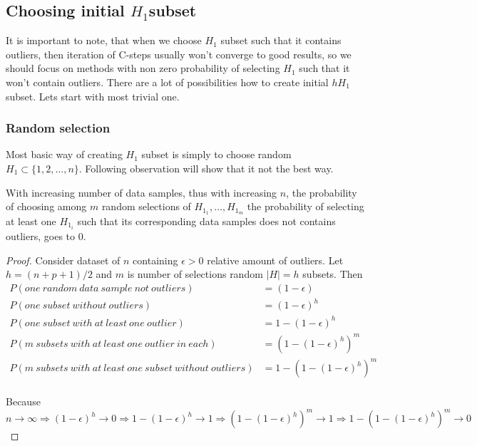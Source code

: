 \subsection{Choosing initial $H_1$subset}

It is important to note, that when we choose $H_1$ subset such that it contains outliers, then iteration of  C-steps
usually won't converge to good results, so we should focus on methods with non zero probability of selecting $H_1$ such that it won't contain outliers.
There are a lot of possibilities how to create initial $hH_1$ subset. Lets start with most trivial one.


\subsubsection{Random selection}
Most basic way of creating $H_1$ subset is simply to choose random $H_1 \subset \{{1,2,\ldots , n\}}$. Following observation will show that it not the best way.

\begin{observation}
	With increasing number of data samples, thus with increasing $n$, the probability of choosing among $m$ random selections of $H_{1_1}, \ldots ,H_{1_m}$ the probability of selecting
	at least one $H_{1_i}$ such that its corresponding data samples does not contains outliers, goes to $0$.
\end{observation}

\begin{proof}
	Consider dataset of $n$ containing $\epsilon > 0$ relative amount of outliers. Let $h=(n+p+1)/2$ and $m$ is number of selections random $|H| = h$ subsets. Then
	\begin{align*}
		P(one~random~data~sample~not~outliers) &= (1-\epsilon) \\
		P(one~subset~without~outliers) &= (1-\epsilon)^h \\
		P(one~subset~with~at~least~one~outlier) &= 1-(1-\epsilon)^h \\
		P(m~subsets~with~at~least~one~outlier~in~each) &= (1-(1-\epsilon)^h)^m \\
		P(m~subsets~with~at~least~one~subset~without~outliers) &= 1-(1-(1-\epsilon)^h)^m \\
	\end{align*}

	Because $n \rightarrow \infty 	
	\Rightarrow (1-\epsilon)^h  \rightarrow 0 	
	\Rightarrow 1- (1-\epsilon)^h  \rightarrow 1
	\Rightarrow (1-(1-\epsilon)^h)^m  \rightarrow 1
	\Rightarrow 1- (1-(1-\epsilon)^h)^m  \rightarrow 0 $
\end{proof}

